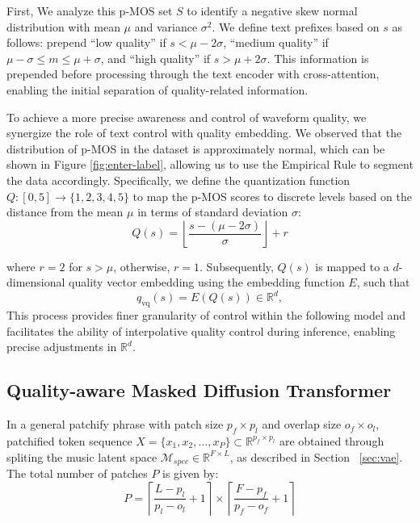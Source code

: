 First, We analyze this p-MOS set \(S\) to identify a negative skew normal distribution with mean \( \mu \) and variance \( \sigma^2 \). We define text prefixes based on \( s \) as follows: prepend ``low quality'' if \( s < \mu - 2\sigma \), ``medium quality'' if \( \mu - \sigma \leq m \leq \mu + \sigma \), and ``high quality'' if \( s > \mu + 2\sigma \). This information is prepended before processing through the text encoder with cross-attention, enabling the initial separation of quality-related information.

To achieve a more precise awareness and control of waveform quality, we synergize the role of text control with quality embedding. We observed that the distribution of p-MOS in the dataset is approximately normal, which can be shown in Figure \ref{fig:enter-label}, allowing us to use the Empirical Rule to segment the data accordingly. Specifically, we define the quantization function \( Q: [0, 5] \to \{1, 2, 3, 4, 5\} \) to map the p-MOS scores to discrete levels based on the distance from the mean \( \mu \) in terms of standard deviation \( \sigma \):
\begin{equation}
Q(s) = \left\lfloor \frac{s - (\mu - 2\sigma)}{\sigma} \right\rfloor + r
\end{equation}

where \(r=2\) %
for \(s>\mu\), otherwise, \(r=1\). 
Subsequently, \( Q(s) \) is mapped to a \( d \)-dimensional quality vector embedding using the embedding function \( E \), such that
\begin{equation}
q_{\text{vq}}(s) = E(Q(s)) \in \mathbb{R}^d,
\end{equation}
This process provides finer granularity of control within the following model and facilitates the ability of interpolative quality control during inference, enabling precise adjustments in \( \mathbb{R}^d \).

\subsection{Quality-aware Masked Diffusion Transformer}
\label{model_architecture}
In a general patchify phrase with patch size \(p_f \times p_l\) and overlap size \(o_f \times o_l\), patchified token sequence \(X=\{x_1, x_2, \dots, x_{P}\} \subset \mathbb{R}^{p_f \times p_l}\) are obtained through spliting the music latent space \(\mathcal{M}_{spec} \in \mathbb{R}^{F \times L}\), as described in Section ~\ref{sec:vae}. The total number of patches \(P\) is given by:
\begin{equation}
P = \left\lceil \frac{L - p_l}{p_l - o_l} + 1 \right\rceil \times \left\lceil \frac{F - p_f}{p_f - o_f} + 1 \right\rceil
\end{equation}

